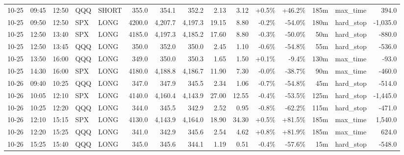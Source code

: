 \documentclass[11pt,a4paper,twoside]{article}
\begin{document}
\begin{landscape}
\begin{center}
\begin{longtable}{>{\color{txtmain}}l l l l l r r r r r r r r >{\color{txtmain}}l r}
10-25 & 09:45 & 12:50 & QQQ & SHORT & 355.0 & 354.1 & 352.2 & 2.13 & 3.12 & \textcolor{wingreen}{+0.5\%} & \textcolor{wingreen}{+46.2\%} & 185m & max\_time & \textcolor{wingreen}{394.0} \\
10-25 & 09:50 & 12:50 & SPX & LONG & 4200.0 & 4,207.7 & 4,197.3 & 19.15 & 8.80 & \textcolor{lossred}{-0.2\%} & \textcolor{lossred}{-54.0\%} & 180m & hard\_stop & \textcolor{lossred}{-1,035.0} \\
10-25 & 12:50 & 13:40 & SPX & LONG & 4185.0 & 4,197.3 & 4,185.2 & 17.60 & 8.80 & \textcolor{lossred}{-0.3\%} & \textcolor{lossred}{-50.0\%} & 50m & hard\_stop & \textcolor{lossred}{-880.0} \\
10-25 & 12:50 & 13:45 & QQQ & LONG & 350.0 & 352.0 & 350.0 & 2.45 & 1.10 & \textcolor{lossred}{-0.6\%} & \textcolor{lossred}{-54.8\%} & 55m & hard\_stop & \textcolor{lossred}{-536.0} \\
10-25 & 13:50 & 16:00 & QQQ & LONG & 349.0 & 350.0 & 350.3 & 1.65 & 1.50 & \textcolor{wingreen}{+0.1\%} & \textcolor{lossred}{-9.4\%} & 130m & max\_time & \textcolor{lossred}{-93.0} \\
10-25 & 14:30 & 16:00 & SPX & LONG & 4180.0 & 4,188.8 & 4,186.7 & 11.90 & 7.30 & \textcolor{lossred}{-0.0\%} & \textcolor{lossred}{-38.7\%} & 90m & max\_time & \textcolor{lossred}{-460.0} \\
10-26 & 09:40 & 10:25 & QQQ & LONG & 347.0 & 347.9 & 345.5 & 2.34 & 1.06 & \textcolor{lossred}{-0.7\%} & \textcolor{lossred}{-54.8\%} & 45m & hard\_stop & \textcolor{lossred}{-514.0} \\
10-26 & 10:05 & 12:10 & SPX & LONG & 4140.0 & 4,160.4 & 4,143.9 & 27.00 & 12.55 & \textcolor{lossred}{-0.4\%} & \textcolor{lossred}{-53.5\%} & 125m & hard\_stop & \textcolor{lossred}{-1,445.0} \\
10-26 & 10:25 & 12:20 & QQQ & LONG & 344.0 & 345.5 & 342.9 & 2.52 & 0.95 & \textcolor{lossred}{-0.8\%} & \textcolor{lossred}{-62.2\%} & 115m & hard\_stop & \textcolor{lossred}{-471.0} \\
10-26 & 12:10 & 15:15 & SPX & LONG & 4130.0 & 4,143.9 & 4,164.0 & 18.90 & 34.30 & \textcolor{wingreen}{+0.5\%} & \textcolor{wingreen}{+81.5\%} & 185m & max\_time & \textcolor{wingreen}{1,540.0} \\
10-26 & 12:20 & 15:25 & QQQ & LONG & 341.0 & 342.9 & 345.6 & 2.54 & 4.62 & \textcolor{wingreen}{+0.8\%} & \textcolor{wingreen}{+81.9\%} & 185m & max\_time & \textcolor{wingreen}{624.0} \\
10-26 & 15:25 & 15:40 & QQQ & LONG & 345.0 & 345.6 & 344.1 & 1.19 & 0.51 & \textcolor{lossred}{-0.4\%} & \textcolor{lossred}{-57.6\%} & 15m & hard\_stop & \textcolor{lossred}{-548.0} \\

\end{longtable}
\end{center}
\end{landscape}
\end{document}
